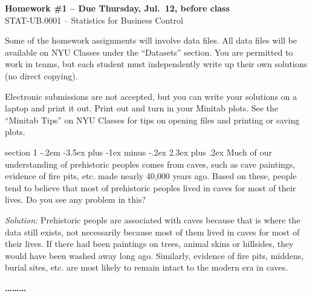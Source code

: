 \documentclass[11pt]{article}
\makeatletter
\newenvironment{problem}{\@startsection
       {section}
       {1}
       {-.2em}
       {-3.5ex plus -1ex minus -.2ex}
       {2.3ex plus .2ex}
       {\pagebreak[3]%
       \large\bf\noindent{Problem }
       }
       }
       {%
       \begin{center}\large\bf \ldots\ldots\ldots\end{center}}
\makeatother
\begin{document}
\begin{center}
  \large
  \textbf{Homework \#1 -- Due Thursday, Jul.~12, before class} \\
  STAT-UB.0001 -- Statistics for Business Control \\
\end{center}
\thispagestyle{empty}

\noindent   Some of the homework assignments will involve data files.  All data
files will be available on NYU Classes under the ``Datasets'' section.  You are
permitted to work in teams, but each student must independently write up their
own solutions (no direct copying).

Electronic submissions are not accepted, but you can write your solutions on a laptop and print it out. Print out and turn in your Minitab plots. See the ``Minitab Tips'' on NYU Classes  for tips on opening files and printing or saving plots.

\begin{problem}{}
Much of our understanding of prehistoric peoples comes from caves, such as cave paintings, evidence of fire pits, etc.  made nearly 40,000 years ago. Based on these, people tend to believe that most of prehistoric peoples lived in caves for most of their lives. Do you see any problem in this?

\vspace{0.2cm}
\textit{Solution:} Prehistoric people are associated with caves because that is where the data still exists, not necessarily because most of them lived in caves for most of their lives.  If there had been paintings on trees, animal skins or hillsides, they would have been washed away long ago. Similarly, evidence of fire pits, middens, burial sites, etc. are most likely to remain intact to the modern era in caves. 
\end{problem}{}
\end{document}
